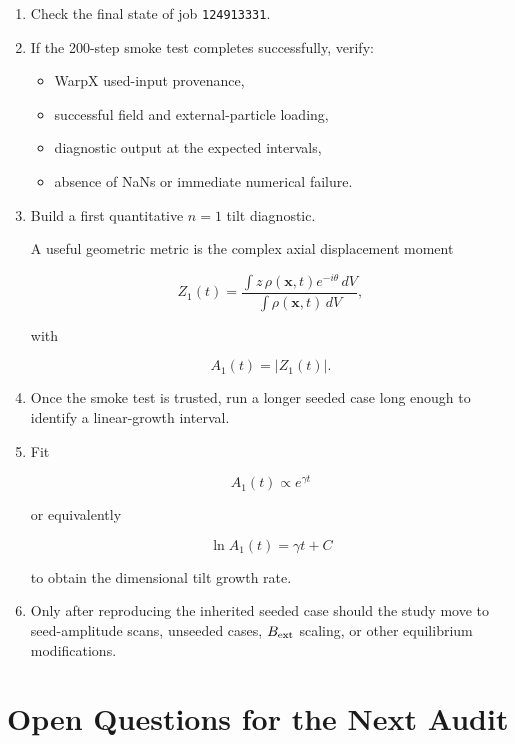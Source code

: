 \documentclass[11pt,a4paper]{article}
\begin{document}
\begin{enumerate}
    \item Check the final state of job \texttt{124913331}.

    \item If the 200-step smoke test completes successfully, verify:
    \begin{itemize}
        \item WarpX used-input provenance,
        \item successful field and external-particle loading,
        \item diagnostic output at the expected intervals,
        \item absence of NaNs or immediate numerical failure.
    \end{itemize}

    \item Build a first quantitative \(n=1\) tilt diagnostic.

    A useful geometric metric is the complex axial displacement moment

    \[
    Z_1(t)
    =
    \frac{
        \int z\,\rho(\mathbf{x},t)e^{-i\theta}\,dV
    }{
        \int \rho(\mathbf{x},t)\,dV
    },
    \]

    with

    \[
    A_1(t)=|Z_1(t)|.
    \]

    \item Once the smoke test is trusted, run a longer seeded case long enough
    to identify a linear-growth interval.

    \item Fit

    \[
    A_1(t)\propto e^{\gamma t}
    \]

    or equivalently

    \[
    \ln A_1(t)=\gamma t+C
    \]

    to obtain the dimensional tilt growth rate.

    \item Only after reproducing the inherited seeded case should the study move
    to seed-amplitude scans, unseeded cases, \(B_{\rm ext}\) scaling, or other
    equilibrium modifications.
\end{enumerate}

\section{Open Questions for the Next Audit}
\end{document}
